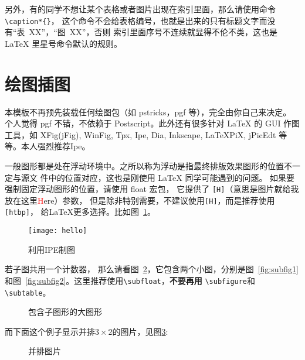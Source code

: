{另外，有的同学不想让某个表格或者图片出现在索引里面，那么请使用命令 \verb|\caption*{}|，
这个命令不会给表格编号，也就是出来的只有标题文字而没有“表~XX”，“图~XX”，否则
索引里面序号{\kai 不连续}就显得不伦不类，这也是 \LaTeX{} 里星号命令默认的规则。

\section{绘图插图}

本模板不再预先装载任何绘图包（如 \textsf{pstricks，pgf} 等），完全由你自己来决定。
个人觉得 \textsf{pgf} 不错，不依赖于 Postscript。此外还有很多针对 \LaTeX{} 的
 GUI 作图工具，如 XFig(jFig), WinFig, Tpx, Ipe, Dia, Inkscape, LaTeXPiX,
jPicEdt 等等。本人强烈推荐\textsf{Ipe}。

一般图形都是处在浮动环境中。之所以称为浮动是指最终排版效果图形的位置不一定与源文
件中的位置对应，这也是刚使用 \LaTeX{} 同学可能遇到的问题。
如果要强制固定浮动图形的位置，请使用 \textsf{float} 宏包，
它提供了 \texttt{[H]}（意思是图片就给我放在这里\textcolor{red}{H}ere）参数，
但是除非特别需要，不建议使用\texttt{[H]}，而是推荐使用\texttt{[htbp]}，
给\LaTeX{}更多选择。比如图~\ref{fig:ipe}。
\begin{figure}[htbp] %
  \centering
  \texttt{[image: hello]}
  \caption{利用IPE制图}
  \label{fig:ipe}
\end{figure}

若子图共用一个计数器，
那么请看图~\ref{fig:big1}，它包含两个小图，分别是图~\ref{fig:subfig1} 
和图~\ref{fig:subfig2}。这里推荐使用\verb|\subfloat|，{\bf 不要再用}
\verb|\subfigure|和\verb|\subtable|。
\begin{figure}[htb]
  \centering%
  \subfloat[第一个小图形]{%
    \label{fig:subfig1}
    \texttt{[image: xh]}}\hspace{4em}%
  \caption{包含子图形的大图形}
  \label{fig:big1}
\end{figure}

而下面这个例子显示并排$3\times2$的图片，见图\ref{fig:subfig:3x2}:
\begin{figure}[htb]
\centering
{} \qquad
{} \qquad
{} \qquad
{} \qquad
{} \qquad
{}
\caption{并排图片}
\label{fig:subfig:3x2}
\end{figure}

}
